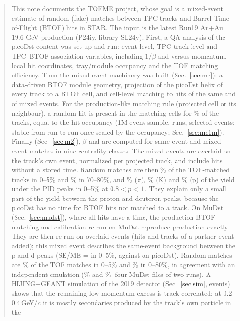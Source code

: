 \begin{abstract}
\noindent This note documents the TOFME project, whose goal is a mixed-event
estimate of random (fake) matches between TPC tracks and Barrel Time-of-Flight (BTOF) hits in STAR.
The input is the latest Run19 Au+Au 19.6 GeV production (P24iy, library SL24y).
First, a QA analysis of the picoDst content was set up and run:
event-level, TPC-track-level and TPC--BTOF-association variables, including $1/\beta$ and
\mtwo{} versus momentum, local hit coordinates, tray/module occupancy and the TOF matching efficiency.
Then the mixed-event machinery was built (Sec.~\ref{sec:me}): a data-driven BTOF module geometry, projection of
the picoDst helix of every track to a BTOF cell, and cell-level matching to hits of the same and of mixed events.
For the production-like matching rule (projected cell or its neighbour), a random hit is present in the matching cells
for \mePMENbpctVthree\% of the tracks, equal to the hit occupancy (1M-event sample, \meNRunsVthree{} runs,
\meEvtSelVthree{} selected events; stable from run to run once scaled by the occupancy; Sec.~\ref{sec:me1m}).
Finally (Sec.~\ref{sec:m2}), $\beta$ and \mtwo{} are computed for same-event and mixed-event matches in nine
centrality classes. The mixed events are overlaid on the track's own event, normalized per projected track, and include
hits without a stored time. Random matches are then \mtMENormFracCiVthree\% of the TOF-matched tracks in 0--5\% and
\mtMENormFracCaVthree\% in 70--80\%, and \mtFrPiMidCiVthree\% ($\pi$), \mtFrKMidCiVthree\% (K) and \mtFrPMidCiVthree\% (p) of
the yield under the PID peaks in 0--5\% at $0.8<p<1$\,\GeVc. They explain only a small part of the yield between the
proton and deuteron peaks, because the picoDst has no time for BTOF hits not matched to a track.
On MuDst (Sec.~\ref{sec:mudst}), where all hits have a time, the production BTOF matching and calibration re-run on MuDst
reproduce production exactly. They are then re-run on overlaid events (hits and tracks of a partner event added); this
mixed event describes the same-event background between the p and d peaks (SE/ME = \ovtHiCi{} in 0--5\%, against
\mtSbRatioAllVnine{} on picoDst). Random matches are \ovtFrCi\% of the TOF matches in 0--5\% and \ovtFrAll\% in 0--80\%, in
agreement with an independent emulation (\muFrProdCi\% and \muFrProdAll\%; four MuDst files of two runs).
A HIJING+GEANT simulation of the 2019 detector (Sec.~\ref{sec:sim}, \simEvGen{} events) shows that the remaining
low-momentum excess is track-correlated: at 0.2--0.4\,GeV/$c$ it is mostly secondaries produced by the track's own particle in the

\end{abstract}

